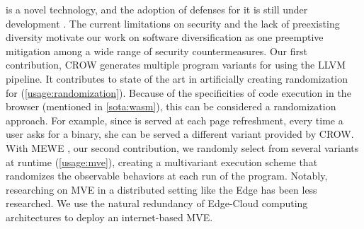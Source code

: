 \wasm is a novel technology, and the adoption of defenses for it is still under development \cite{Narayan2021Swivel, johnson2021}. The current limitations on security and the lack of preexisting diversity motivate our work on software diversification as one preemptive mitigation among a wide range of security countermeasures.
Our first contribution, CROW \cite{CROW} generates multiple program variants for \wasm using the LLVM pipeline.
It contributes to state of the art in artificially creating randomization for \wasm (\autoref{usage:randomization}). Because of the specificities of code execution in the browser (mentioned in \autoref{sota:wasm}), this can be considered a randomization approach. For example, since \wasm is served at each page refreshment, every time a user asks for a \wasm binary, she can be served a different variant provided by CROW. 
With MEWE \cite{MEWE}, our second contribution, we randomly select from several variants at runtime (\autoref{usage:mve}), creating a multivariant execution scheme that randomizes the observable behaviors at each run of the program. Notably, researching on MVE in a distributed setting like the Edge \citationneeded has been less researched. We use the natural redundancy of Edge-Cloud computing architectures to deploy an internet-based MVE.

